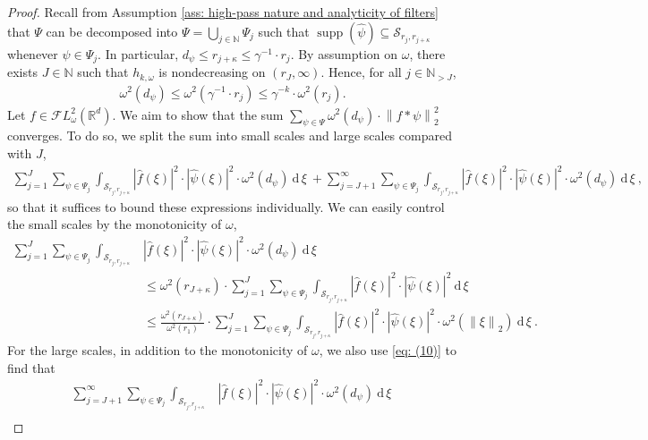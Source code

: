 \documentclass[11pt]{amsart}
\newcommand{\R}{{\mathbb{R}}}
\newcommand{\N}{\mathbb{N}}
\newcommand{\dxi}{\:\mathrm{d}\,\xi\:}
\newcommand{\norm}[1]{\ensuremath{\left\lVert\text{}#1\text{}\right\rVert}}
\DeclareMathOperator{\supp}{supp}
\newenvironment{proof sketch} {\textit{Proof sketch.}}{}
\begin{document}
  \begin{proof}
    Recall from Assumption \ref{ass: high-pass nature and analyticity of filters} that $\Psi$ can be decomposed into $\Psi=\bigcup_{j\in \N} \Psi_j$ such that $\supp(\widehat{\psi})\subseteq \mathcal{S}_{r_j,r_{j+\kappa}}$ whenever $\psi \in \Psi_j$. In particular, $d_\psi \leq r_{j+\kappa}\leq \gamma^{-1}\cdot r_j$. 
    By assumption on $\omega$, there exists $J \in \N$ such that $h_{k,\omega}$ 
    is nondecreasing on $(r_J,\infty)$. Hence, for all $j \in \N_{>J}$, 
    \begin{align}\label{eq: (10)}
      \omega^2(d_\psi) \leq \omega^2(\gamma^{-1}\cdot r_j) \leq \gamma^{-k} \cdot \omega^2(r_j).
    \end{align}
    Let $f \in \mathcal{F}L_\omega^2(\R^d)$. We aim to show that the sum $\sum_{\psi \in \Psi} \omega^{2}(d_\psi) \cdot \norm{f*\psi}_2^2$ converges. To do so, we split the sum into small scales and large scales compared with $J$,
    \begin{align*}
      \sum_{j=1}^J \sum_{\psi \in \Psi_j} \int_{\mathcal{S}_{r_j,r_{j+\kappa}}} |\widehat{f}(\xi)|^2 \cdot |\widehat{\psi}(\xi)|^2 \cdot \omega^{2}(d_\psi) \dxi + \sum_{j=J+1}^\infty \sum_{\psi \in \Psi_j} \int_{\mathcal{S}_{r_j,r_{j+\kappa}}} |\widehat{f}(\xi)|^2 \cdot |\widehat{\psi}(\xi)|^2 \cdot \omega^{2}(d_\psi) \dxi,
    \end{align*}
    so that it suffices to bound these expressions individually. We can easily control the small scales by the monotonicity of $\omega$, 
    \begin{align*}
      \sum_{j=1}^J \sum_{\psi \in \Psi_j} \int_{\mathcal{S}_{r_j,r_{j+\kappa}}} &|\widehat{f}(\xi)|^2 \cdot |\widehat{\psi}(\xi)|^2 \cdot \omega^{2}(d_\psi) \dxi \\
      &\leq \omega^{2}(r_{J+\kappa}) \cdot \sum_{j=1}^J \sum_{\psi \in \Psi_j} \int_{\mathcal{S}_{r_j,r_{j+\kappa}}} |\widehat{f}(\xi)|^2 \cdot |\widehat{\psi}(\xi)|^2 \dxi \\
      &\leq \frac{\omega^{2}(r_{J+\kappa})}{\omega^2(r_1)} \cdot \sum_{j=1}^J \sum_{\psi \in \Psi_j} \int_{\mathcal{S}_{r_j,r_{j+\kappa}}} |\widehat{f}(\xi)|^2 \cdot |\widehat{\psi}(\xi)|^2 \cdot \omega^2(\norm{\xi}_2) \dxi.
    \end{align*} 
    For the large scales, in addition to the monotonicity of $\omega$, we also use \eqref{eq: (10)} to find that
    \begin{align*}
      \sum_{j=J+1}^\infty \sum_{\psi \in \Psi_j} \int_{\mathcal{S}_{r_j,r_{j+\kappa}}} &|\widehat{f}(\xi)|^2 \cdot |\widehat{\psi}(\xi)|^2 \cdot \omega^{2}(d_\psi) \dxi \\

\end{align*}
\end{proof}
\end{document}
